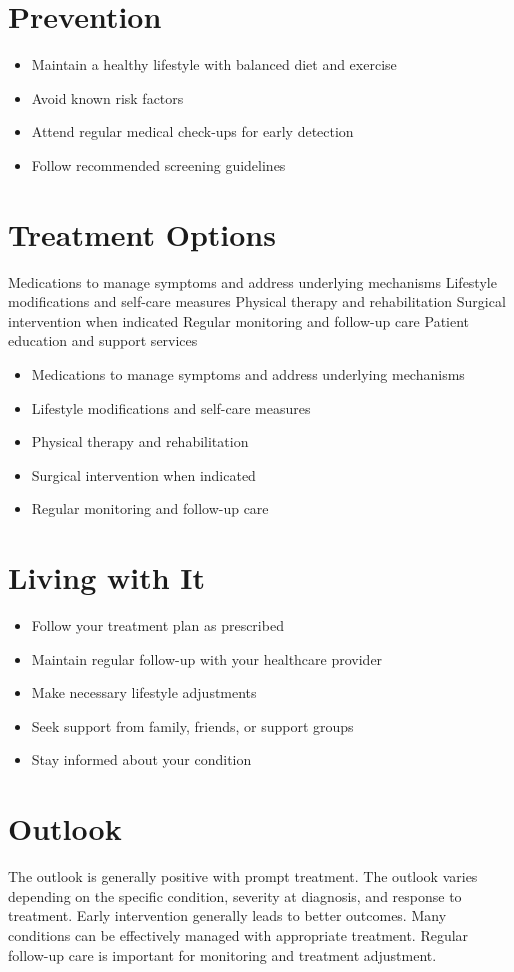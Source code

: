 \section{Prevention}
\begin{itemize}[noitemsep]
  \item Maintain a healthy lifestyle with balanced diet and exercise
  \item Avoid known risk factors
  \item Attend regular medical check-ups for early detection
  \item Follow recommended screening guidelines
\end{itemize}
\section{Treatment Options}
Medications to manage symptoms and address underlying mechanisms Lifestyle modifications and self-care measures Physical therapy and rehabilitation Surgical intervention when indicated Regular monitoring and follow-up care Patient education and support services

\begin{itemize}[noitemsep]
  \item Medications to manage symptoms and address underlying mechanisms
  \item Lifestyle modifications and self-care measures
  \item Physical therapy and rehabilitation
  \item Surgical intervention when indicated
  \item Regular monitoring and follow-up care
\end{itemize}
\section{Living with It}
\begin{itemize}[noitemsep]
  \item Follow your treatment plan as prescribed
  \item Maintain regular follow-up with your healthcare provider
  \item Make necessary lifestyle adjustments
  \item Seek support from family, friends, or support groups
  \item Stay informed about your condition
\end{itemize}
\section{Outlook}
The outlook is generally positive with prompt treatment. The outlook varies depending on the specific condition, severity at diagnosis, and response to treatment. Early intervention generally leads to better outcomes. Many conditions can be effectively managed with appropriate treatment. Regular follow-up care is important for monitoring and treatment adjustment.
